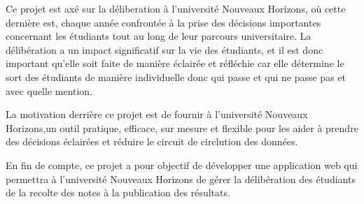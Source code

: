 Ce projet est axé sur la déliberation à l'université Nouveaux Horizons,
où cette dernière est, chaque année confrontée à la prise des
décisions importantes concernant les étudiants
tout au long de leur parcours universitaire. 
La délibération a un impact significatif sur 
la vie des étudiants, et il est donc important qu'elle
soit faite de manière éclairée et réfléchie car elle détermine 
le sort des étudiants de manière individuelle donc qui passe et 
qui ne passe pas et avec quelle mention.


La motivation derrière ce projet est de fournir à  
l'université Nouveaux Horizons,un outil pratique, efficace, 
sur mesure et flexible pour les aider à 
prendre des décisions éclairées et réduire le circuit de circlution
des données.

En fin de compte, ce projet a pour objectif de développer une application web
qui permettra à l'université Nouveaux Horizons de gérer
la délibération des étudiants de la recolte des notes 
à la publication des résultats.

